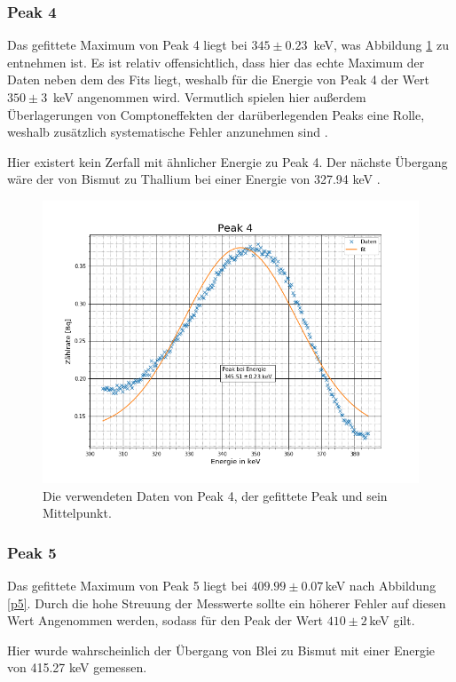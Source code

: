 \subsubsection{Peak 4}
Das gefittete Maximum von Peak 4 liegt bei $345\pm0.23\,$ keV, was Abbildung \ref{p4} zu entnehmen ist. Es ist relativ offensichtlich, dass hier das echte Maximum der Daten neben dem des Fits liegt, weshalb für die Energie von Peak 4 der Wert $350\pm3\,$ keV angenommen wird. Vermutlich spielen hier außerdem Überlagerungen von Comptoneffekten der darüberlegenden Peaks eine Rolle, weshalb zusätzlich systematische Fehler anzunehmen sind \cite{staatsex_szinti}.\par
Hier existert kein Zerfall mit ähnlicher Energie zu Peak 4. Der nächste Übergang wäre der von Bismut zu Thallium bei einer Energie von 327.94 keV \cite{Bismut}. 
\begin{figure}[h]
	\centering
	\includegraphics[scale=0.7]{Bilder/Anhang/P4}
	\caption[Thorium Peak 4]{\small Die verwendeten Daten von Peak 4, der gefittete Peak und sein Mittelpunkt.}
	\label{p4}
\end{figure}
\FloatBarrier
\subsubsection{Peak 5}
Das gefittete Maximum von Peak 5 liegt bei $409.99\pm0.07\,$keV nach Abbildung \ref{p5}. Durch die hohe Streuung der Messwerte sollte ein höherer Fehler auf diesen Wert Angenommen werden, sodass für den Peak der Wert $410\pm2\,$keV gilt.\par
Hier wurde wahrscheinlich der Übergang von Blei zu Bismut mit einer Energie von 415.27 keV \cite{Blei} gemessen. 

